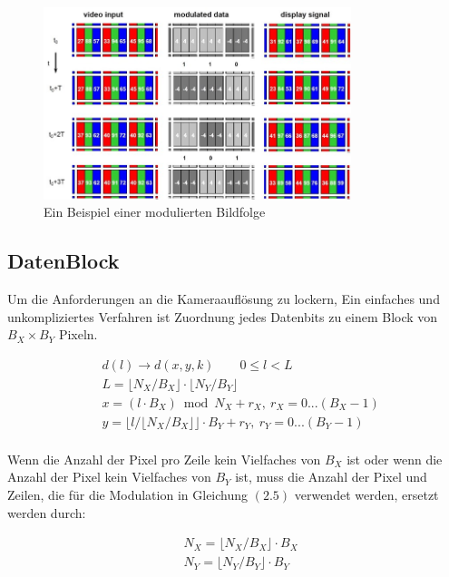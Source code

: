 \begin{figure}[htb]
	\centering 
	\includegraphics[keepaspectratio,width=0.8\textwidth]{images/David4.jpg}
	\caption{Ein Beispiel einer modulierten Bildfolge}
	\label{fig:David4}
\end{figure}



\subsection{DatenBlock}

Um die Anforderungen an die Kameraauflösung zu lockern, Ein einfaches und unkompliziertes Verfahren ist Zuordnung jedes Datenbits zu einem Block von $B_X \times B_Y$ Pixeln.

\begin{equation}
\begin{split}
  & d(l)\rightarrow d(x,y,k) \qquad 0\le l <L \\
  & L=\lfloor N_X/B_X \rfloor \cdot \lfloor N_Y/B_Y \rfloor \\
  & x=(l \cdot B_X) \bmod N_X +r_X, \ r_X =0...(B_X -1) \\
  & y=\lfloor l / \lfloor N_X/B_X \rfloor \rfloor \cdot B_Y +r_Y, \ r_Y =0...(B_Y -1) \\
\end{split}
\end{equation}

Wenn die Anzahl der Pixel pro Zeile kein Vielfaches von $B_X$ ist oder wenn die Anzahl der Pixel kein Vielfaches von $B_Y$ ist, muss die Anzahl der Pixel und Zeilen, die für die Modulation in Gleichung $\left(2.5\right)$ verwendet werden, ersetzt werden durch:

\begin{equation}
\begin{split}
  & N_X = \lfloor N_X/B_X \rfloor \cdot B_X\\ 
  & N_Y = \lfloor N_Y/B_Y \rfloor \cdot B_Y\\ 
\end{split}
\end{equation}

